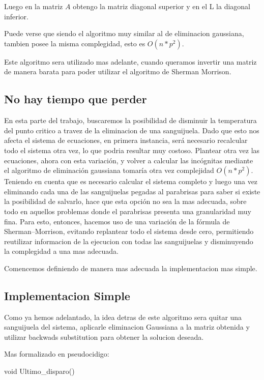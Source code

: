 Luego en la matriz $A$ obtengo la matriz diagonal superior y en el L la diagonal inferior.

Puede verse que siendo el algoritmo muy similar al de eliminacion gaussiana, tambien posee la misma complegidad, esto es $O(n*p^2)$.

Este algoritmo sera utilizado mas adelante, cuando queramos invertir una matriz de manera barata para poder utilizar el algoritmo de Sherman Morrison.

\subsection{No hay tiempo que perder}

En esta parte del trabajo, buscaremos la posibilidad de disminuir la temperatura del punto critico a travez de la eliminacion de una sanguijuela. Dado que esto nos afecta el sistema de ecuaciones, en primera instancia, ser\'a necesario recalcular todo el sistema otra vez, lo que podria resultar muy costoso. Plantear otra vez las ecuaciones, ahora con esta variaci\'on, y volver a calcular las inc\'ognitas mediante el algoritmo de eliminaci\'on gaussiana tomar\'ia otra vez complejidad $O(n*p^2)$. Teniendo en cuenta que es necesario calcular el sistema completo y luego una vez eliminando cada una de las sanguijuelas pegadas al parabrisas para saber si existe la posibilidad de salvarlo, hace que esta opci\'on no sea la mas adecuada, sobre todo en aquellos problemas donde el parabrisas presenta una granularidad muy fina. Para esto, entonces, hacemos uso de una variaci\'on de la f\'ormula de Sherman–Morrison, evitando replantear todo el sistema desde cero, permitiendo reutilizar informacion de la ejecucion con todas las sanguijuelas y disminuyendo la complegidad a una mas adecuada.

Comencemos definiendo de manera mas adecuada la implementacion mas simple.

\subsection{Implementacion Simple}

Como ya hemos adelantado, la idea detras de este algoritmo sera quitar una sanguijuela del sistema, aplicarle eliminacion Gaussiana a la matriz obtenida y utilizar backwads substitution para obtener la solucion deseada.

Mas formalizado en pseudocidigo:

\begin{algorithm}
\begin{algorithmic}[1]\parskip=1mm
\caption{void Ultimo_disparo()}
\end{algorithmic}
\end{algorithm}

